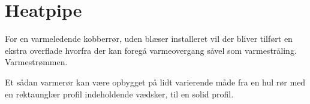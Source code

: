 \section{Heatpipe}

For en varmeledende kobberrør, uden blæser installeret vil der bliver tilført en ekstra overflade hvorfra der kan foregå varmeovergang såvel som varmestråling.
Varmestrømmen.

Et sådan varmerør kan være opbygget på lidt varierende måde fra en hul rør med en rektaunglær profil indeholdende vædsker, til en solid profil. 
